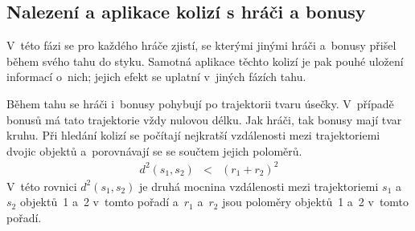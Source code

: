 

\subsection*{Nalezení a aplikace kolizí s hráči a bonusy}

V~této fázi se pro každého hráče zjistí, se kterými jinými hráči a~bonusy přišel během svého tahu do styku. Samotná aplikace těchto kolizí je pak pouhé uložení informací o~nich; jejich efekt se uplatní v~jiných fázích tahu.

Během tahu se hráči i~bonusy pohybují po trajektorii tvaru úsečky. V~případě bonusů má tato trajektorie vždy nulovou délku. Jak hráči, tak bonusy mají tvar kruhu. Při hledání kolizí se počítají nejkratší vzdálenosti mezi trajektoriemi dvojic objektů a~porovnávají se se součtem jejich poloměrů.
\begin{eqnarray}
    d^2(s_1, s_2) & < & (r_1 + r_2)^2
\end{eqnarray}
V~této rovnici $d^2(s_1, s_2)$ je druhá mocnina vzdálenosti mezi trajektoriemi $s_1$ a~$s_2$ objektů~1 a~2 v~tomto pořadí a~$r_1$ a~$r_2$ jsou poloměry objektů~1 a~2 v~tomto pořadí.

